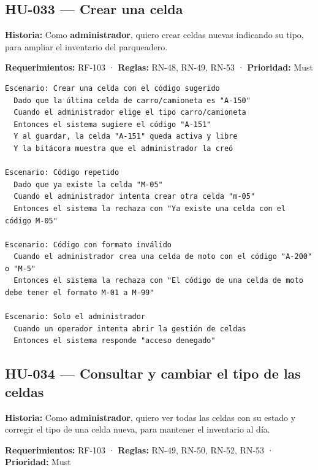 \subsection{HU-033 — Crear una celda}

\textbf{Historia:} Como \textbf{administrador}, quiero crear celdas nuevas indicando su tipo, para ampliar el inventario del parqueadero.


\textbf{Requerimientos:} RF-103 · \textbf{Reglas:} RN-48, RN-49, RN-53 · \textbf{Prioridad:} Must


\begin{lstlisting}[style=gherkin]
Escenario: Crear una celda con el código sugerido
  Dado que la última celda de carro/camioneta es "A-150"
  Cuando el administrador elige el tipo carro/camioneta
  Entonces el sistema sugiere el código "A-151"
  Y al guardar, la celda "A-151" queda activa y libre
  Y la bitácora muestra que el administrador la creó

Escenario: Código repetido
  Dado que ya existe la celda "M-05"
  Cuando el administrador intenta crear otra celda "m-05"
  Entonces el sistema la rechaza con "Ya existe una celda con el código M-05"

Escenario: Código con formato inválido
  Cuando el administrador crea una celda de moto con el código "A-200" o "M-5"
  Entonces el sistema la rechaza con "El código de una celda de moto debe tener el formato M-01 a M-99"

Escenario: Solo el administrador
  Cuando un operador intenta abrir la gestión de celdas
  Entonces el sistema responde "acceso denegado"
\end{lstlisting}

\subsection{HU-034 — Consultar y cambiar el tipo de las celdas}

\textbf{Historia:} Como \textbf{administrador}, quiero ver todas las celdas con su estado y corregir el tipo de una celda nueva, para mantener el inventario al día.


\textbf{Requerimientos:} RF-103 · \textbf{Reglas:} RN-49, RN-50, RN-52, RN-53 · \textbf{Prioridad:} Must


